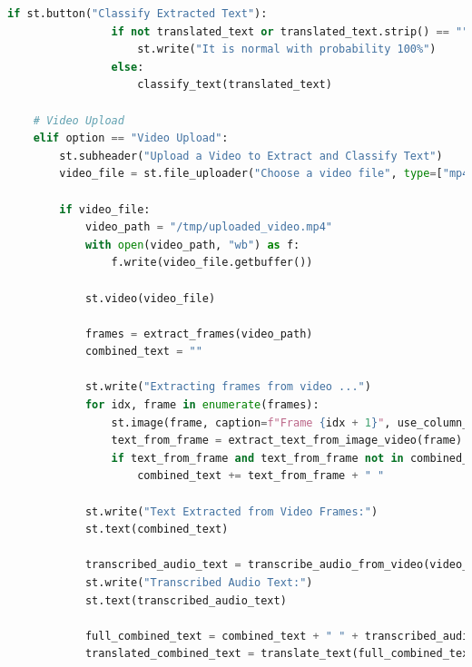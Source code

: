     \begin{tcolorbox}[colback=gray!5!white, colframe=gray!80!black, boxrule=0.5pt, title=Streamlit Mental Health Disorder Detection App]
        \begin{lstlisting}[language=Python]
            if st.button("Classify Extracted Text"):
                if not translated_text or translated_text.strip() == "":
                    st.write("It is normal with probability 100%")
                else:
                    classify_text(translated_text)

    # Video Upload
    elif option == "Video Upload":
        st.subheader("Upload a Video to Extract and Classify Text")
        video_file = st.file_uploader("Choose a video file", type=["mp4", "mov", "avi"])

        if video_file:
            video_path = "/tmp/uploaded_video.mp4"
            with open(video_path, "wb") as f:
                f.write(video_file.getbuffer())

            st.video(video_file)

            frames = extract_frames(video_path)
            combined_text = ""

            st.write("Extracting frames from video ...")
            for idx, frame in enumerate(frames):
                st.image(frame, caption=f"Frame {idx + 1}", use_column_width=True)
                text_from_frame = extract_text_from_image_video(frame)
                if text_from_frame and text_from_frame not in combined_text:
                    combined_text += text_from_frame + " "

            st.write("Text Extracted from Video Frames:")
            st.text(combined_text)

            transcribed_audio_text = transcribe_audio_from_video(video_file)
            st.write("Transcribed Audio Text:")
            st.text(transcribed_audio_text)

            full_combined_text = combined_text + " " + transcribed_audio_text
            translated_combined_text = translate_text(full_combined_text)
        \end{lstlisting}
    \end{tcolorbox}
